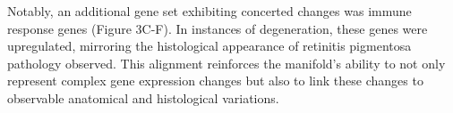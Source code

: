 \documentclass[11pt, a4paper]{article}
\newcommand{\cngb}{\textit{Cngb$^{neo/neo}$}~}
\begin{document}
Notably, an additional gene set exhibiting concerted changes was immune response genes (Figure 3C-F). In instances of degeneration, these genes were upregulated, mirroring the histological appearance of retinitis pigmentosa pathology observed. This alignment reinforces the manifold's ability to not only represent complex gene expression changes but also to link these changes to observable anatomical and histological variations. 




\end{document}
